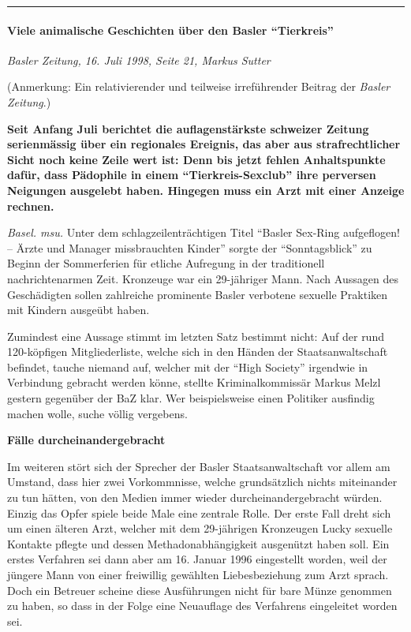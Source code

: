 \begin{center}\rule{0.5\linewidth}{\linethickness}\end{center}

\hypertarget{viele-animalische-geschichten-uxfcber-den-basler-tierkreis}{%
\paragraph{Viele animalische Geschichten über den Basler
``Tierkreis''}\label{viele-animalische-geschichten-uxfcber-den-basler-tierkreis}}

\emph{Basler Zeitung, 16. Juli 1998, Seite 21, Markus Sutter}

(Anmerkung: Ein relativierender und teilweise irreführender Beitrag der
\emph{Basler Zeitung}.)

\textbf{Seit Anfang Juli berichtet die auflagenstärkste schweizer
Zeitung serienmässig über ein regionales Ereignis, das aber aus
strafrechtlicher Sicht noch keine Zeile wert ist: Denn bis jetzt fehlen
Anhaltspunkte dafür, dass Pädophile in einem ``Tierkreis-Sexclub'' ihre
perversen Neigungen ausgelebt haben. Hingegen muss ein Arzt mit einer
Anzeige rechnen.}

\emph{Basel. msu.} Unter dem schlagzeilenträchtigen Titel ``Basler
Sex-Ring aufgeflogen! -- Ärzte und Manager missbrauchten Kinder'' sorgte
der ``Sonntagsblick'' zu Beginn der Sommerferien für etliche Aufregung
in der traditionell nachrichtenarmen Zeit. Kronzeuge war ein 29-jähriger
Mann. Nach Aussagen des Geschädigten sollen zahlreiche prominente Basler
verbotene sexuelle Praktiken mit Kindern ausgeübt haben.

Zumindest eine Aussage stimmt im letzten Satz bestimmt nicht: Auf der
rund 120-köpfigen Mitgliederliste, welche sich in den Händen der
Staatsanwaltschaft befindet, tauche niemand auf, welcher mit der ``High
Society'' irgendwie in Verbindung gebracht werden könne, stellte
Kriminalkommissär Markus Melzl gestern gegenüber der BaZ klar. Wer
beispielsweise einen Politiker ausfindig machen wolle, suche völlig
vergebens.

\textbf{Fälle durcheinandergebracht}

Im weiteren stört sich der Sprecher der Basler Staatsanwaltschaft vor
allem am Umstand, dass hier zwei Vorkommnisse, welche grundsätzlich
nichts miteinander zu tun hätten, von den Medien immer wieder
durcheinandergebracht würden. Einzig das Opfer spiele beide Male eine
zentrale Rolle. Der erste Fall dreht sich um einen älteren Arzt, welcher
mit dem 29-jährigen Kronzeugen Lucky sexuelle Kontakte pflegte und
dessen Methadonabhängigkeit ausgenützt haben soll. Ein erstes Verfahren
sei dann aber am 16. Januar 1996 eingestellt worden, weil der jüngere
Mann von einer freiwillig gewählten Liebesbeziehung zum Arzt sprach.
Doch ein Betreuer scheine diese Ausführungen nicht für bare Münze
genommen zu haben, so dass in der Folge eine Neuauflage des Verfahrens
eingeleitet worden sei.

